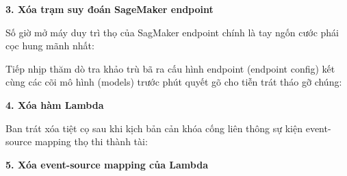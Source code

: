 \vspace{0.5em}\noindent\textbf{3. Xóa trạm suy đoán SageMaker
endpoint}\par

Số giờ mở máy duy trì thọ của SagMaker endpoint chính là tay ngốn cước
phái cọc hung mãnh nhất:

\begin{Shaded}
\begin{Highlighting}[]
\DataTypeTok{\textbackslash{}}
  \DataTypeTok{\textbackslash{}}
\end{Highlighting}
\end{Shaded}

Tiếp nhịp thăm dò tra khảo trù bã ra cấu hình endpoint (endpoint config)
kết cùng các cõi mô hình (models) trước phút quyết gõ cho tiễn trát tháo
gỡ chúng:

\begin{Shaded}
\begin{Highlighting}[]
\end{Highlighting}
\end{Shaded}

\vspace{0.5em}\noindent\textbf{4. Xóa hàm Lambda}\par

Ban trát xóa tiệt cọ sau khi kịch bản cản khóa cống liên thông sự kiện
event-source mapping thọ thi thành tài:

\begin{Shaded}
\begin{Highlighting}[]
\DataTypeTok{\textbackslash{}}
  \DataTypeTok{\textbackslash{}}
\end{Highlighting}
\end{Shaded}

\vspace{0.5em}\noindent\textbf{5. Xóa event-source mapping của
Lambda}\par

